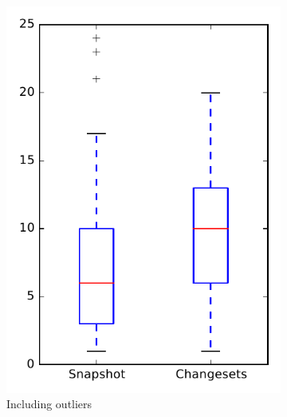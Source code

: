 
\begin{figure}
    \centering
    \begin{subfigure}{.4\textwidth}
        \centering
        \includegraphics[height=0.4\textheight]{figures/dit/rq1_pig}
        \caption{Including outliers}\label{fig:dit:rq1:pig_outlier}
    \end{subfigure}%
    \begin{subfigure}{.4\textwidth}
        \centering

\end{subfigure}
\end{figure}
